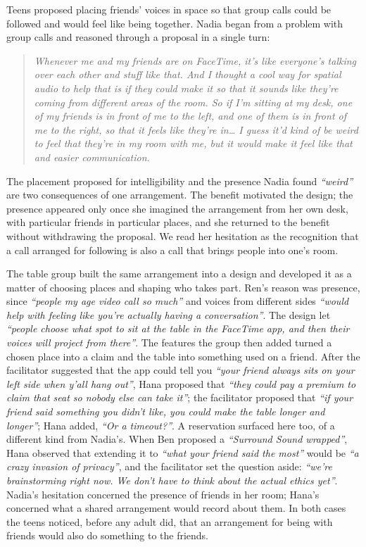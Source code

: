 Teens proposed placing friends' voices in space so that group calls could be followed and would feel like being together. Nadia began from a problem with group calls and reasoned through a proposal in a single turn:

\begin{quote}
\textit{Whenever me and my friends are on FaceTime, it's like everyone's talking over each other and stuff like that. And I thought a cool way for spatial audio to help that is if they could make it so that it sounds like they're coming from different areas of the room. So if I'm sitting at my desk, one of my friends is in front of me to the left, and one of them is in front of me to the right, so that it feels like they're in\ldots{} I guess it'd kind of be weird to feel that they're in my room with me, but it would make it feel like that and easier communication.}
\end{quote}

The placement proposed for intelligibility and the presence Nadia found \textit{``weird''} are two consequences of one arrangement. The benefit motivated the design; the presence appeared only once she imagined the arrangement from her own desk, with particular friends in particular places, and she returned to the benefit without withdrawing the proposal. We read her hesitation as the recognition that a call arranged for following is also a call that brings people into one's room.

The table group built the same arrangement into a design and developed it as a matter of choosing places and shaping who takes part. Ren's reason was presence, since \textit{``people my age video call so much''} and voices from different sides \textit{``would help with feeling like you're actually having a conversation''}. The design let \textit{``people choose what spot to sit at the table in the FaceTime app, and then their voices will project from there''}. The features the group then added turned a chosen place into a claim and the table into something used on a friend. After the facilitator suggested that the app could tell you \textit{``your friend always sits on your left side when y'all hang out''}, Hana proposed that \textit{``they could pay a premium to claim that seat so nobody else can take it''}; the facilitator proposed that \textit{``if your friend said something you didn't like, you could make the table longer and longer''}; Hana added, \textit{``Or a timeout?''}. A reservation surfaced here too, of a different kind from Nadia's. When Ben proposed a \textit{``Surround Sound wrapped''}, Hana observed that extending it to \textit{``what your friend said the most''} would be \textit{``a crazy invasion of privacy''}, and the facilitator set the question aside: \textit{``we're brainstorming right now. We don't have to think about the actual ethics yet''}. Nadia's hesitation concerned the presence of friends in her room; Hana's concerned what a shared arrangement would record about them. In both cases the teens noticed, before any adult did, that an arrangement for being with friends would also do something to the friends.

